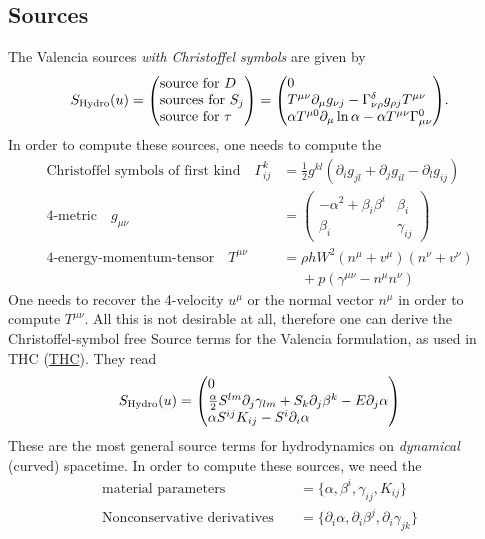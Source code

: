 \documentclass[a4paper]{article}
\newcommand{\desc}[1]{\text{#1}\quad}
\newcommand{\hydro}{\text{Hydro}}
\newenvironment{pvector}{\begin{pmatrix*}[l]}{\end{pmatrix*}}
\begin{document}
\subsection{Sources}
The Valencia sources \emph{with Christoffel symbols} are given by
\begin{equation}
S_\hydro(u) =
\begin{pvector}
\text{source for } D \\
\text{sources for } S_j \\
\text{source for } \tau
\end{pvector}
=
\begin{pvector}
0
\\
T^{\mu\nu} \partial_\mu g_{\nu j} - \Gamma^\delta_{\nu\rho} g_{\rho j} T^{\mu\nu}
\\
\alpha T^{\mu 0} \partial_\mu \ln \alpha - \alpha T^{\mu\nu} \Gamma^0_{\mu\nu}
\end{pvector}.
\end{equation}
In order to compute these sources, one needs to compute the
\begin{align}
\desc{Christoffel symbols of first kind} \Gamma^k_{ij}
&= \frac{1}{2} g^{kl} \left(\partial_i g_{jl} + \partial_j g_{il} - \partial_l g_{ij}\right)
\\
\desc{4-metric}
g_{\mu\nu} &= 
\begin{pmatrix}
-\alpha^2 + \beta_i \beta^i  & \beta_i \\
\beta_i                      & \gamma_{ij}
\end{pmatrix}
\\
\desc{4-energy-momentum-tensor}
T^{\mu\nu} &=
\rho h W^2 (n^\mu + v^\mu) (n^\nu + v^\nu)
\\ &\phantom{=} + p(\gamma^{\mu\nu} - n^\mu n^\nu)
\nonumber
\end{align}
One needs to recover the 4-velocity $u^\mu$ or the normal vector
$n^\mu$ in order to compute $T^{\mu\nu}$. All this is not desirable
at all, therefore one can derive the Christoffel-symbol free Source
terms for the Valencia formulation, as used in THC
(\href{https://arxiv.org/abs/1312.5004}{THC}). They read
\begin{equation}
S_\hydro(u) =
\begin{pvector}
0
\\
\frac \alpha2 S^{lm} \partial_j \gamma_{lm} + S_k \partial_j \beta^k - E \partial_j \alpha
\\
\alpha S^{ij} K_{ij} - S^i \partial_i \alpha
\end{pvector}
\end{equation}
These are the most general source terms for hydrodynamics on
\emph{dynamical} (curved) spacetime. In order to compute these sources,
we need the
\begin{align}
\desc{material parameters}  &= \{ \alpha, \beta^i, \gamma_{ij}, K_{ij} \}
\\
\desc{Nonconservative derivatives} &= \{ \partial_i \alpha,
\partial_i \beta^j, \partial_i \gamma_{jk} \}
\end{align}
\end{document}
